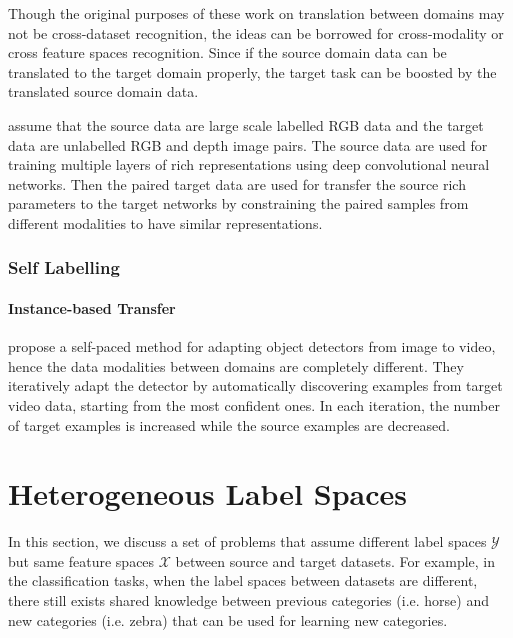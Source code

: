 \documentclass[prodmode]{acmsmall}  %
\begin{document}
Though the original purposes of these work on translation between domains may not be cross-dataset recognition, the ideas can be borrowed for cross-modality or cross feature spaces recognition. Since if the source domain data can be translated to the target domain properly, the target task can be boosted by the translated source domain data.


 assume that the source data are large scale labelled RGB data and the target data are unlabelled RGB and depth image pairs. The source data are used for training multiple layers of rich representations using deep convolutional neural networks. Then the paired target data are used for transfer the source rich parameters to the target networks by constraining the paired samples from different modalities to have similar representations.

\subsubsection{Self Labelling}
\paragraph{Instance-based Transfer}
 propose a self-paced method for adapting object detectors from image to video, hence the data modalities between domains are completely different. They iteratively adapt the detector by automatically discovering examples from target video data, starting from the most confident ones. In each iteration, the number of target examples is increased while the source examples are decreased.

\section{Heterogeneous Label Spaces}
\label{sec:HETEL}
In this section, we discuss a set of problems that assume different label spaces $\mathcal{Y}$ but same feature spaces $\mathcal{X}$ between source and target datasets. For example, in the classification tasks, when the label spaces between datasets are different, there still exists shared knowledge between previous categories (i.e. horse) and new categories (i.e. zebra) that can be used for learning new categories.
\end{document}
